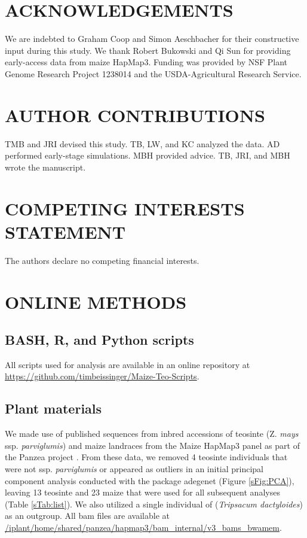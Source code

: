 \documentclass[twoside, twocolumn, letterpaper]{article}
\renewcommand{\baselinestretch}{1}
\begin{document}
\section*{ACKNOWLEDGEMENTS}
We are indebted to Graham Coop and Simon Aeschbacher for their constructive input during this study. We thank Robert Bukowski and Qi Sun for providing early-access data from maize HapMap3. Funding was provided by NSF Plant Genome Research Project 1238014 and the USDA-Agricultural Research Service.

\section*{AUTHOR CONTRIBUTIONS}
TMB and JRI devised this study. TB, LW, and KC analyzed the data. AD performed early-stage simulations. MBH provided advice. TB, JRI, and MBH wrote the manuscript.


\section*{COMPETING INTERESTS STATEMENT}
The authors declare no competing financial interests.

{\scriptsize \sf
\renewcommand{\baselinestretch}{2.0}


}



\clearpage
\section*{ONLINE METHODS}
\subsection*{BASH, R, and Python scripts}
All scripts used for analysis are available in an online repository at \url{https://github.com/timbeissinger/Maize-Teo-Scripts}. 

\subsection*{Plant materials}
We made use of published sequences from inbred accessions of teosinte (Z. {\it mays} ssp. {\it parviglumis}) and maize landraces from the Maize HapMap3 panel as part of the Panzea project  \cite{chia2012, lemmon2014, bukowski2015}. 
From these data, we removed 4 teosinte individuals that were not ssp. \textit{parviglumis} or appeared as outliers in an initial principal component analysis conducted with the package adegenet \cite{jombart2011} (Figure \ref{sFig:PCA}), leaving 13 teosinte and 23 maize that were used for all subsequent analyses (Table \ref{sTab:list}). We also utilized a single individual of (\textit{Tripsacum dactyloides}) as an outgroup.  All bam files are available at \url{/iplant/home/shared/panzea/hapmap3/bam\_internal/v3\_bams\_bwamem}. 
\end{document}
